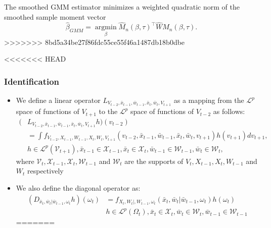 \documentclass{beamer}
\begin{document}
\begin{frame}
\begin{itemize}
\begin{frame}
\begin{itemize}
\begin{frame}
\begin{itemize}
	The smoothed GMM estimator minimizes a weighted quadratic norm of the smoothed sample moment vector
	\begin{equation}
		\hat{\beta}_{GMM}=\underset{\beta}{\operatorname{argmin}}\hat{M}_{n}(\beta, \tau)^{\top}\hat{W}\hat{M}_{n}(\beta, \tau).
		\end{equation}
>>>>>>> 8bd5a34be27f86fdc55ce55f46a1487db18b0dbe
\end{itemize}
\end{frame}

<<<<<<< HEAD
\begin{frame}
\frametitle{Identification}
\begin{itemize}
\item We define a linear operator $L_{V_{t-2},\bar{x}_{t-1},\bar{w}_{t-1},\bar{x}_{t},\bar{w}_{t}, V_{t+1}}$ as a mapping from the $\mathcal{L}^{p}$ space of functions of $V_{t+1}$ to the $\mathcal{L}^{p}$ space of functions of $V_{t-2}$ as follows:
\small
\begin{equation}\label{operator}
    \begin{split}
     (&L_{V_{t-2},\bar{x}_{t-1},\bar{w}_{t-1},\bar{x}_{t},\bar{w}_{t}, V_{t+1}}h)(v_{t-2})\\
     &=\int f_{V_{t-2}, X_{t-1}, W_{t-1}, X_{t}, W_{t}, V_{t+1}}(v_{t-2}, \bar{x}_{t-1}, \bar{w}_{t-1}, \bar{x}_{t}, \bar{w}_{t}, v_{t+1})h(v_{t+1})dv_{t+1},\\
     &h\in \mathcal{L}^{p}(\mathcal{V}_{t+1}), \bar{x}_{t-1}\in \mathcal{X}_{t-1}, \bar{x}_{t}\in \mathcal{X}_{t}, \bar{w}_{t-1}\in \mathcal{W}_{t-1}, \bar{w}_{t}\in \mathcal{W}_{t},
    \end{split}
\end{equation}
\normalsize
where $\mathcal{V}_{t}, \mathcal{X}_{t-1}, \mathcal{X}_{t}, \mathcal{W}_{t-1}$ and $\mathcal{W}_{t}$ are the supports of $V_{t}, X_{t-1}, X_{t}, W_{t-1}$ and $W_{t}$ respectively
\item We also define the diagonal operator as:
\begin{equation}\label{diagonal}
    \begin{split}
        (D_{\bar{x}_{t}, \bar{w}_{t}|\bar{w}_{t-1}, \omega_{t}}h)(\omega_{t})&=f_{X_{t}, W_{t}|, W_{t-1}, \omega_{t}}(\bar{x}_{t}, \bar{w}_{t}|\bar{w}_{t-1}, \omega_{t})h(\omega_{t})\\
        &h\in \mathcal{L}^{p}(\Omega_{t}), \bar{x}_{t}\in \mathcal{X}_{t}, \bar{w}_{t}\in \mathcal{W}_{t}, \bar{w}_{t-1}\in \mathcal{W}_{t-1}
    \end{split}
\end{equation}
=======


\end{itemize}
\end{frame}
\end{itemize}
\end{frame}
\end{itemize}
\end{frame}
\end{document}
